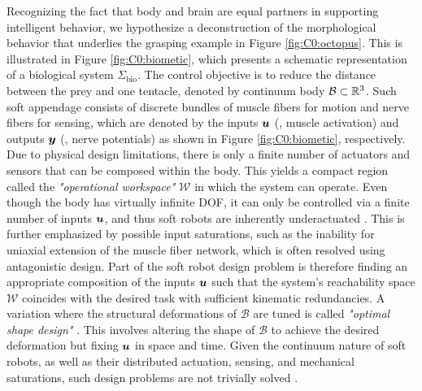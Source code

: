 Recognizing the fact that body and brain are equal partners in supporting intelligent behavior, we hypothesize a deconstruction of the morphological behavior that underlies the grasping example in Figure \ref{fig:C0:octopus}. This is illustrated in Figure \ref{fig:C0:biometic}, which presents a schematic representation of a biological system $\Sigma_{\textrm{bio}}$. The control objective is to reduce the distance between the prey and one tentacle, denoted by continuum body $\mathcal{B} \subset \mathbb{R}^3$. Such soft appendage consists of discrete bundles of muscle fibers for motion and nerve fibers for sensing, which are denoted by the inputs ${\boldsymbol{u}}$ (\eg, muscle activation) and outputs ${\boldsymbol{y}}$ (\eg, nerve potentials) as shown in Figure \ref{fig:C0:biometic}, respectively. Due to physical design limitations, there is only a finite number of actuators and sensors that can be composed within the body. This yields a compact region called the \textit{"operational workspace"} $\mathcal{W}$ \cite{Spong1996,Murray1994,Ortega1998} in which the system can operate. Even though the body has virtually infinite DOF, it can only be controlled via a finite number of inputs ${\boldsymbol{u}}$, and thus soft robots are inherently underactuated \cite{Spong1996a,Russ2022}. This is further emphasized by possible input saturations, such as the inability for uniaxial extension of the muscle fiber network, which is often resolved using antagonistic design. Part of the soft robot design problem is therefore finding an appropriate composition of the inputs ${\boldsymbol{u}}$ such that the system's reachability space $\mathcal{W}$ coincides with the desired task with sufficient kinematic redundancies. A variation where the structural deformations of $\mathcal{B}$ are tuned is called \textit{"optimal shape design"} \cite{Bendsoe2003}. This involves altering the shape of $\mathcal{B}$ to achieve the desired deformation but fixing ${\boldsymbol{u}}$ in space and time. Given the continuum nature of soft robots, as well as their distributed actuation, sensing, and mechanical saturations, such design problems are not trivially solved \cite{Xavier2022Jun,Bern2019,Coevoet2017Feb,Tian2020May,Smith2022}.

